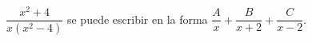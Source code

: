 \item $\dfrac{x^2 + 4}{x(x^2 - 4)}$ se puede escribir en la forma $\dfrac{A}{x} + \dfrac{B}{x + 2} + \dfrac{C}{x - 2}$.
